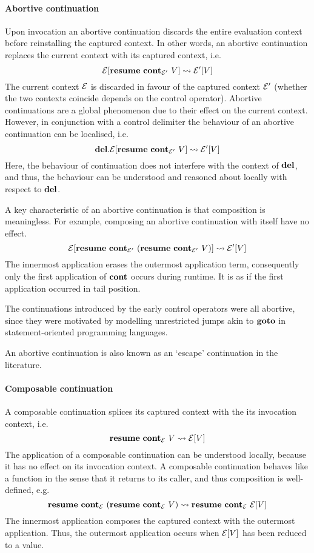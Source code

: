 \documentclass[12pt,phd,lfcs,twoside,openright,logo,leftchapter,normalheadings]{infthesis}
\theoremstyle{plain}
\theoremstyle{definition}
\begin{document}
\paragraph{Abortive continuation} Upon invocation an abortive
continuation discards the entire evaluation context before
reinstalling the captured context. In other words, an abortive
continuation replaces the current context with its captured context,
i.e.
%
\[
  \mathcal{E}[\mathbf{resume}~\mathbf{cont}_{\mathcal{E}'}~V] \leadsto \mathcal{E}'[V]
\]
%
The current context $\mathcal{E}$ is discarded in favour of the captured
context $\mathcal{E}'$ (whether the two contexts coincide depends on the
control operator).  Abortive continuations are a global phenomenon due
to their effect on the current context. However, in conjunction with a
control delimiter the behaviour of an abortive continuation can be
localised, i.e.
%
\[
  \mathbf{del}.\mathcal{E}[\mathbf{resume}~\mathbf{cont}_{\mathcal{E}'}~V] \leadsto \mathcal{E}'[V]
\]
%
Here, the behaviour of continuation does not interfere with the
context of $\mathbf{del}$, and thus, the behaviour can be understood and
reasoned about locally with respect to $\mathbf{del}$.

A key characteristic of an abortive continuation is that composition
is meaningless. For example, composing an abortive continuation with
itself have no effect.
%
\[
  \mathcal{E}[\mathbf{resume}~\mathbf{cont}_{\mathcal{E}'}~(\mathbf{resume}~\mathbf{cont}_{\mathcal{E}'}~V)] \leadsto \mathcal{E}'[V]
\]
%
The innermost application erases the outermost application term,
consequently only the first application of $\mathbf{cont}$ occurs during
runtime. It is as if the first application occurred in tail position.

The continuations introduced by the early control operators were all
abortive, since they were motivated by modelling unrestricted jumps
akin to $\mathbf{goto}$ in statement-oriented programming languages.

An abortive continuation is also known as an `escape' continuation in
the literature.

\paragraph{Composable continuation} A composable continuation splices
its captured context with the its invocation context, i.e.
%
\[
  \mathbf{resume}~\mathbf{cont}_{\mathcal{E}}~V \leadsto \mathcal{E}[V]
\]
%
The application of a composable continuation can be understood
locally, because it has no effect on its invocation context. A
composable continuation behaves like a function in the sense that it
returns to its caller, and thus composition is well-defined, e.g.
%
\[
  \mathbf{resume}~\mathbf{cont}_{\mathcal{E}}~(\mathbf{resume}~\mathbf{cont}_{\mathcal{E}}~V) \leadsto \mathbf{resume}~\mathbf{cont}_{\mathcal{E}}~\mathcal{E}[V]
\]
%
The innermost application composes the captured context with the
outermost application. Thus, the outermost application occurs when
$\mathcal{E}[V]$ has been reduced to a value.
\end{document}
